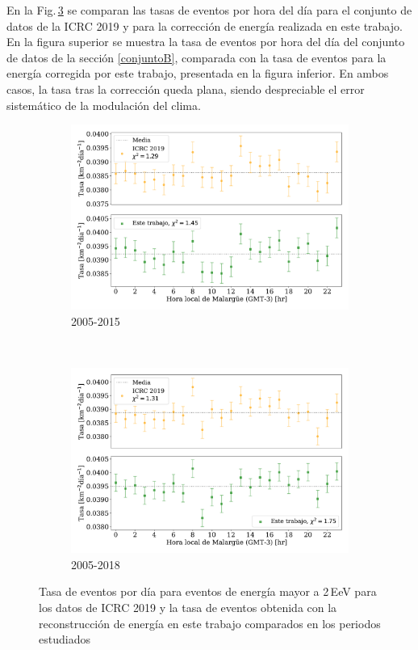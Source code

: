 En la Fig.\,\ref{final} se comparan las tasas de eventos por hora del día para el conjunto de datos de la ICRC 2019 y para la corrección de energía realizada en este trabajo. En la figura superior se muestra la tasa de eventos por hora del día del conjunto de datos de la sección \ref{conjuntoB}, comparada con la tasa de eventos para la energía corregida por este trabajo, presentada en la figura inferior. En ambos casos, la tasa tras la corrección queda plana, siendo despreciable el error sistemático de la modulación del clima.
   \begin{figure}[H]
       \centering
           \begin{subfigure}[b]{0.8\textwidth}
           \includegraphics[width=\textwidth]{Graphs/rate_hour_of_the_day/2EeV_ICRC_2019_S38_S1000_expected.pdf}
           \caption{2005-2015} \label{fig:2EeV_expected}
           \end{subfigure}\\
           \begin{subfigure}[b]{0.8\textwidth}
           \includegraphics[width=\textwidth]{Graphs/rate_hour_of_the_day/2EeV_ICRC_2019_S38_S1000_expected_05_18.pdf}
           \caption{2005-2018}\label{fig:2EeV_expected_05_18}
           \end{subfigure}%
           \caption{Tasa de eventos por día para eventos de energía mayor a 2\,EeV para los datos de ICRC 2019 y la tasa de eventos obtenida con la reconstrucción de energía en este trabajo comparados en los periodos estudiados}\label{final}
   \end{figure}
